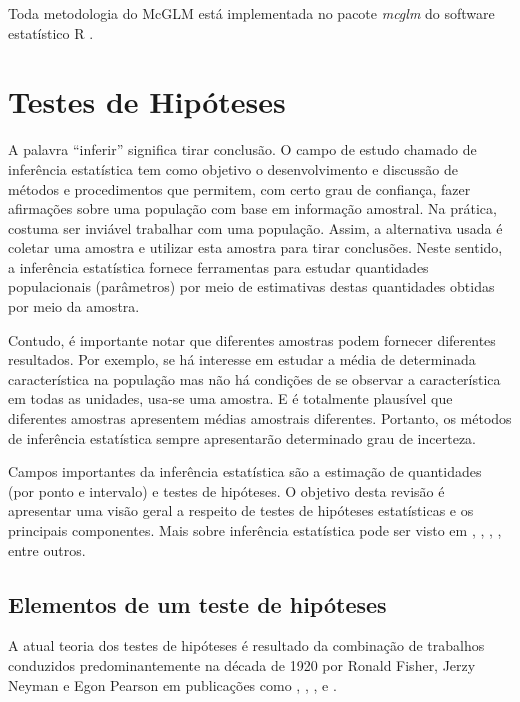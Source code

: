 Toda metodologia do McGLM está implementada no pacote \emph{mcglm} \citep{mcglm} do software estatístico R \citep{softwareR}.


\section{Testes de Hipóteses}

A palavra ``inferir'' significa tirar conclusão. O campo de estudo chamado de inferência estatística tem como objetivo o desenvolvimento e discussão de métodos e procedimentos que permitem, com certo grau de confiança, fazer afirmações sobre uma população com base em informação amostral. Na prática, costuma ser inviável trabalhar com uma população. Assim, a alternativa usada é coletar uma amostra e utilizar esta amostra para tirar conclusões. Neste sentido, a inferência estatística fornece ferramentas para estudar quantidades populacionais (parâmetros) por meio de estimativas destas quantidades obtidas por meio da amostra.

Contudo, é importante notar que diferentes amostras podem fornecer diferentes resultados. Por exemplo, se há interesse em estudar a média de determinada característica na população mas não há condições de se observar a característica em todas as unidades, usa-se uma amostra. E é totalmente plausível que diferentes amostras apresentem médias amostrais diferentes. Portanto, os métodos de inferência estatística sempre apresentarão determinado grau de incerteza. 

Campos importantes da inferência estatística são a estimação de quantidades (por ponto e intervalo) e testes de hipóteses. O objetivo desta revisão é apresentar uma visão geral a respeito de testes de hipóteses estatísticas e os principais componentes. Mais sobre inferência estatística pode ser visto em \citet{barndorff2017}, \citet{silvey2017}, \citet{azzalini2017}, \citet{wasserman2013all}, entre outros.

\subsection{Elementos de um teste de hipóteses}

A atual teoria dos testes de hipóteses é resultado da combinação de  trabalhos conduzidos predominantemente na década de 1920 por Ronald Fisher, Jerzy Neyman e Egon Pearson em publicações como \citet{fisherarrangement}, \citet{fisher1929}, \citet{neyman2020use1}, \citet{neyman2020use2} e \citet{neyman1933ix}. 

